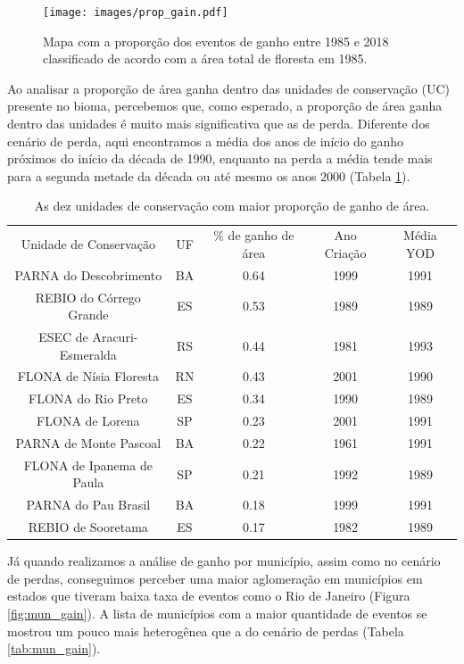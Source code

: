 \begin{figure}[H]
    \centering
    \texttt{[image: images/prop\_gain.pdf]}
    \caption{Mapa com a proporção dos eventos de ganho entre 1985 e 2018 classificado de acordo com a área total de floresta em 1985.}
    \label{fig:prop_gain}
\end{figure}

Ao analisar a proporção de área ganha dentro das unidades de conservação (UC) presente no bioma, percebemos que, como esperado, a proporção de área ganha dentro das unidades é muito mais significativa que as de perda. Diferente dos cenário de perda, aqui encontramos a média dos anos de início do ganho próximos do início da década de 1990, enquanto na perda a média tende mais para a segunda metade da década ou até mesmo os anos 2000 (Tabela \ref{tab:uc_gain}). 

\begin{table}[H]
    \centering
    \begin{tabular}{|c | c | c | c | c|}
    \hline
            Unidade de Conservação & UF & \% de ganho de área  & Ano Criação & Média YOD \\
                PARNA do Descobrimento & BA & 0.64 & 1999 & 1991 \\ 
                REBIO do Córrego Grande & ES & 0.53 & 1989 & 1989 \\
                ESEC de Aracuri-Esmeralda & RS & 0.44 & 1981 & 1993 \\
                FLONA de Nísia Floresta & RN & 0.43 & 2001 & 1990 \\
                FLONA do Rio Preto & ES & 0.34 & 1990 & 1989 \\
                FLONA de Lorena & SP & 0.23 & 2001 & 1991 \\
                PARNA de Monte Pascoal & BA & 0.22 & 1961 & 1991 \\
                FLONA de Ipanema de Paula & SP & 0.21 & 1992 & 1989 \\
                PARNA do Pau Brasil & BA & 0.18 & 1999 & 1991 \\
                REBIO de Sooretama & ES & 0.17 & 1982 & 1989 \\
    \hline
    \end{tabular}
    \caption{As dez unidades de conservação com maior proporção de ganho de área.}
    \label{tab:uc_gain}
\end{table}

Já quando realizamos a análise de ganho por município, assim como no cenário de perdas, conseguimos perceber uma maior aglomeração em municípios em estados que tiveram baixa taxa de eventos como o Rio de Janeiro (Figura \ref{fig:mun_gain}). A lista de municípios com a maior quantidade de eventos se mostrou um pouco mais heterogênea que a do cenário de perdas (Tabela \ref{tab:mun_gain}). 

